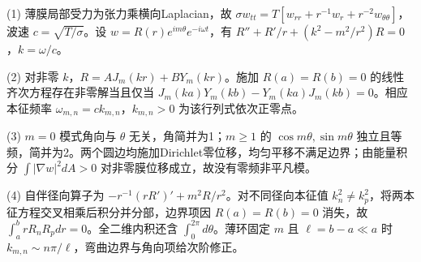 (1) 薄膜局部受力为张力乘横向Laplacian，故 \(\sigma w_{tt}=T[w_{rr}+r^{-1}w_r+r^{-2}w_{\theta\theta}]\)，波速 \(c=\sqrt{T/\sigma}\)。设 \(w=R(r)e^{im\theta}e^{-i\omega t}\)，有 \(R''+R'/r+(k^2-m^2/r^2)R=0\)，\(k=\omega/c\)。

(2) 对非零 \(k\)，\(R=A J_m(kr)+B Y_m(kr)\)。施加 \(R(a)=R(b)=0\) 的线性齐次方程存在非零解当且仅当 \(\boxed{J_m(ka)Y_m(kb)-Y_m(ka)J_m(kb)=0}\)。相应本征频率 \(\omega_{m,n}=c k_{m,n}\)，\(k_{m,n}>0\) 为该行列式依次正零点。

(3) \(m=0\) 模式角向与 \(\theta\) 无关，角简并为1；\(m\ge1\) 的 \(\cos m\theta,\sin m\theta\) 独立且等频，简并为2。两个圆边均施加Dirichlet零位移，均匀平移不满足边界；由能量积分 \(\int|\nabla w|^2dA>0\) 对非零膜位移成立，故没有零频非平凡模。

(4) 自伴径向算子为 \(-r^{-1}(rR')'+m^2R/r^2\)。对不同径向本征值 \(k_n^2\ne k_p^2\)，将两本征方程交叉相乘后积分并分部，边界项因 \(R(a)=R(b)=0\) 消失，故 \(\int_a^b rR_nR_pdr=0\)。全二维内积还含 \(\int_0^{2\pi}d\theta\)。薄环固定 \(m\) 且 \(\ell=b-a\ll a\) 时 \(k_{m,n}\sim n\pi/\ell\)，弯曲边界与角向项给次阶修正。

